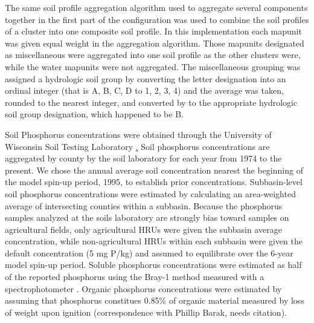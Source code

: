The same soil profile aggregation algorithm \citep{beaudette_aqp_2013} used to aggregate several components together in the first part of the configuration was used to combine the soil profiles of a cluster into one composite soil profile. In this implementation each mapunit was given equal weight in the aggregation algorithm. Those mapunits designated as miscellaneous were aggregated into one soil profile as the other clusters were, while the water mapunits were not aggregated. The miscellaneous  grouping was assigned a hydrologic soil group by converting the letter designation into an ordinal integer (that is A, B, C, D to 1, 2, 3, 4) and the average was taken, rounded to the nearest integer, and converted by to the appropriate hydrologic soil group designation, which happened to be B. 

Soil Phosphorus concentrations were obtained through the University of Wisconsin Soil Testing Laboratory \href{http://uwlab.soils.wisc.edu/}. Soil phosphorus concentrations are aggregated by county by the soil laboratory for each year from 1974 to the present. We chose the annual average soil concentration nearest the beginning of the model spin-up period, 1995, to establish prior concentrations. Subbasin-level soil phosphorus concentrations were estimated by calculating an area-weighted average of intersecting counties within a subbasin. Because the phosphorus samples analyzed at the soils laboratory are strongly bias toward samples on agricultural fields, only agricultural HRUs were given the subbasin average concentration, while non-agricultural HRUs within each subbasin were given the default concentration (5 mg P/kg) and assumed to equilibrate over the 6-year model spin-up period. Soluble phosphorus concentrations were estimated as half of the reported phosphorus using the Bray-1 method measured with a spectrophotometer \citep{vadas_validating_2010}. Organic phosphorus concentrations were estimated by assuming that phosphorus constitues 0.85\% of organic material measured by loss of weight upon ignition (correspondence with Phillip Barak, needs citation).

